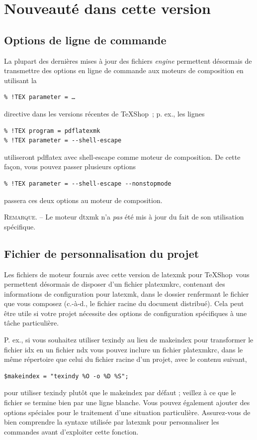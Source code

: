 \documentclass[11pt,french]{article}
\newcommand{\TS}{\textsf{\TeX Shop}}
\newcommand{\cmd}[1]{\textsf{#1}}
\begin{document}
\section{Nouveauté dans cette version} 

\subsection{Options de ligne de commande}\label{sec/CLO}

La plupart des dernières mises à jour des fichiers \emph{engine} permettent désormais de transmettre des options en ligne de commande aux moteurs de composition en utilisant la
\begin{verbatim}
% !TEX parameter = …
\end{verbatim}
directive dans les versions récentes de \TS\ ; p. ex., les lignes 
\begin{verbatim}
% !TEX program = pdflatexmk
% !TEX parameter = --shell-escape
\end{verbatim}
utiliseront \cmd{pdflatex} avec \cmd{shell-escape} comme moteur de composition. De cette façon, vous pouvez passer plusieurs options
\begin{verbatim}
% !TEX parameter = --shell-escape --nonstopmode
\end{verbatim}
passera ces deux options au moteur de composition.

\noindent\textsc{Remarque}. --  Le moteur \cmd{dtxmk} n'a \emph{pas} été mis à jour du fait de son utilisation spécifique. 

\subsection{Fichier de personnalisation du projet}

Les fichiers de moteur fournis avec cette version de \cmd{latexmk} pour \TS\ vous permettent désormais de disposer d'un fichier \cmd{platexmkrc}, contenant des informations de configuration pour \cmd{latexmk}, dans le dossier renfermant le fichier que vous composez (c.-à-d., le fichier racine du document distribué). Cela peut être utile si votre projet nécessite des options de configuration spécifiques à une tâche particulière.

P. ex., si vous souhaitez utiliser \cmd{texindy} au lieu de \cmd{makeindex} pour transformer le fichier \cmd{idx} en un fichier \cmd{ndx} vous pouvez inclure un fichier \cmd{platexmkrc}, dans le même répertoire que celui du fichier racine d'un projet, avec le contenu suivant,
\begin{verbatim}
$makeindex = "texindy %O -o %D %S";
\end{verbatim}
pour utiliser \cmd{texindy} plutôt que le \cmd{makeindex} par défaut ; veillez à ce que le fichier se termine bien par une ligne blanche. Vous pouvez également ajouter des options spéciales pour le traitement d'une situation particulière. Assurez-vous de bien comprendre la syntaxe utilisée par \cmd{latexmk} pour personnaliser les commandes avant d'exploiter cette fonction.
\end{document}
